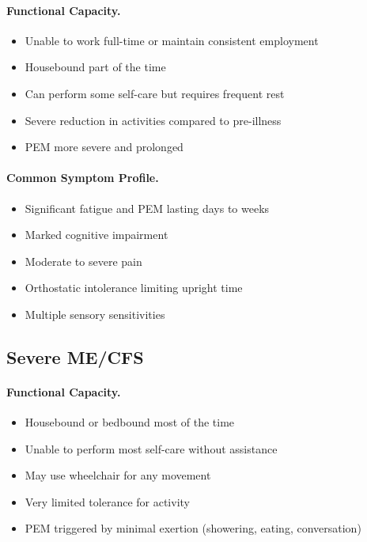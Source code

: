 \paragraph{Functional Capacity.}
\begin{itemize}
    \item Unable to work full-time or maintain consistent employment
    \item Housebound part of the time
    \item Can perform some self-care but requires frequent rest
    \item Severe reduction in activities compared to pre-illness
    \item PEM more severe and prolonged
\end{itemize}

\paragraph{Common Symptom Profile.}
\begin{itemize}
    \item Significant fatigue and PEM lasting days to weeks
    \item Marked cognitive impairment
    \item Moderate to severe pain
    \item Orthostatic intolerance limiting upright time
    \item Multiple sensory sensitivities
\end{itemize}

\subsection{Severe ME/CFS}
\label{subsec:severe-mecfs}

\paragraph{Functional Capacity.}
\begin{itemize}
    \item Housebound or bedbound most of the time
    \item Unable to perform most self-care without assistance
    \item May use wheelchair for any movement
    \item Very limited tolerance for activity
    \item PEM triggered by minimal exertion (showering, eating, conversation)
\end{itemize}

